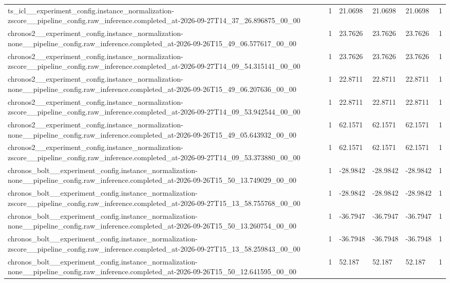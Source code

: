 \begin{tabular}{llllll}
ts\_icl\_\_experiment\_config.instance\_normalization-zscore\_\_pipeline\_config.raw\_inference.completed\_at-2026-09-27T14\_37\_26.896875\_00\_00 & 1 & 21.0698 & 21.0698 & 21.0698 & 1 \\
chronos2\_\_experiment\_config.instance\_normalization-none\_\_pipeline\_config.raw\_inference.completed\_at-2026-09-26T15\_49\_06.577617\_00\_00 & 1 & 23.7626 & 23.7626 & 23.7626 & 1 \\
chronos2\_\_experiment\_config.instance\_normalization-zscore\_\_pipeline\_config.raw\_inference.completed\_at-2026-09-27T14\_09\_54.315141\_00\_00 & 1 & 23.7626 & 23.7626 & 23.7626 & 1 \\
chronos2\_\_experiment\_config.instance\_normalization-none\_\_pipeline\_config.raw\_inference.completed\_at-2026-09-26T15\_49\_06.207636\_00\_00 & 1 & 22.8711 & 22.8711 & 22.8711 & 1 \\
chronos2\_\_experiment\_config.instance\_normalization-zscore\_\_pipeline\_config.raw\_inference.completed\_at-2026-09-27T14\_09\_53.942544\_00\_00 & 1 & 22.8711 & 22.8711 & 22.8711 & 1 \\
chronos2\_\_experiment\_config.instance\_normalization-none\_\_pipeline\_config.raw\_inference.completed\_at-2026-09-26T15\_49\_05.643932\_00\_00 & 1 & 62.1571 & 62.1571 & 62.1571 & 1 \\
chronos2\_\_experiment\_config.instance\_normalization-zscore\_\_pipeline\_config.raw\_inference.completed\_at-2026-09-27T14\_09\_53.373880\_00\_00 & 1 & 62.1571 & 62.1571 & 62.1571 & 1 \\
chronos\_bolt\_\_experiment\_config.instance\_normalization-none\_\_pipeline\_config.raw\_inference.completed\_at-2026-09-26T15\_50\_13.749029\_00\_00 & 1 & -28.9842 & -28.9842 & -28.9842 & 1 \\
chronos\_bolt\_\_experiment\_config.instance\_normalization-zscore\_\_pipeline\_config.raw\_inference.completed\_at-2026-09-27T15\_13\_58.755768\_00\_00 & 1 & -28.9842 & -28.9842 & -28.9842 & 1 \\
chronos\_bolt\_\_experiment\_config.instance\_normalization-none\_\_pipeline\_config.raw\_inference.completed\_at-2026-09-26T15\_50\_13.260754\_00\_00 & 1 & -36.7947 & -36.7947 & -36.7947 & 1 \\
chronos\_bolt\_\_experiment\_config.instance\_normalization-zscore\_\_pipeline\_config.raw\_inference.completed\_at-2026-09-27T15\_13\_58.259843\_00\_00 & 1 & -36.7948 & -36.7948 & -36.7948 & 1 \\
chronos\_bolt\_\_experiment\_config.instance\_normalization-none\_\_pipeline\_config.raw\_inference.completed\_at-2026-09-26T15\_50\_12.641595\_00\_00 & 1 & 52.187 & 52.187 & 52.187 & 1 \\

\end{tabular}
